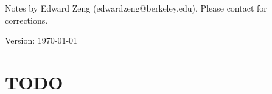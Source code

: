 \def\topic{Simplicial Homology}



    \begin{center}
        \color{blue}
        \textsf{Notes by Edward Zeng (edwardzeng@berkeley.edu). Please contact for corrections.}

        \color{red}
        \textsf{Version: \today}
    \end{center}

    \section{TODO}



